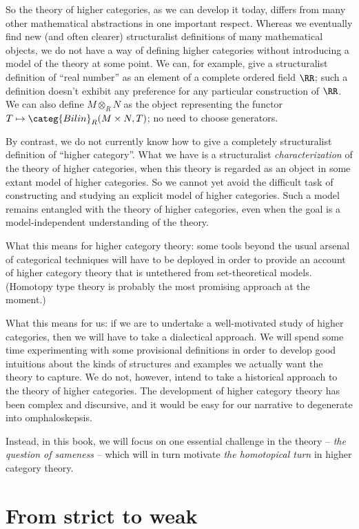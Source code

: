 So the theory of higher categories, as we can develop it today, differs from many other mathematical abstractions in one important respect.
Whereas we eventually find new (and often clearer) structuralist definitions of many mathematical objects,
we do not have a way of defining higher categories without introducing a model of the theory at some point.
We can, for example, give a structuralist definition of \enquote{real number} as an element of a complete ordered field $\RR$;
such a definition doesn't exhibit any preference for any particular construction of $\RR$.
We can also define $M \otimes_R N$ as the object representing the functor $T \mapsto \categ{Bilin}_R(M \times N, T)$;
no need to choose generators.

By contrast, we do not currently know how to give a completely structuralist definition of \enquote{higher category}.
What we have is a structuralist \emph{characterization} of the theory of higher categories, when this theory is regarded as an object in some extant model of higher categories.
So we cannot yet avoid the difficult task of constructing and studying an explicit model of higher categories.
Such a model remains entangled with the theory of higher categories,
even when the goal is a model-independent understanding of the theory.

What this means for higher category theory:
some tools beyond the usual arsenal of categorical techniques will have to be deployed in order to provide an account of higher category theory that is untethered from set-theoretical models.
(Homotopy type theory is probably the most promising approach at the moment.)

What this means for us:
if we are to undertake a well-motivated study of higher categories, then
we will have to take a dialectical approach.
We will spend some time experimenting with some provisional definitions in order to develop good intuitions about the kinds of structures and examples we actually want the theory to capture.
We do not, however, intend to take a historical approach to the theory of higher categories.
The development of higher category theory has been complex and discursive, and
it would be easy for our narrative to degenerate into omphaloskepsis.

Instead, in this book, we will focus on one essential challenge in the theory -- \emph{the question of sameness} -- which will in turn motivate \emph{the homotopical turn} in higher category theory.

\section*{From strict to weak}%
\label{sec:strictweak}%

